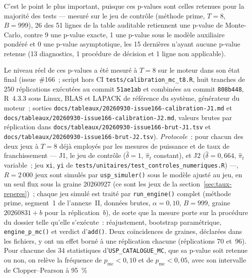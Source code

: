 \documentclass[a4paper,11pt]{article}
\newcommand{\code}[1]{\texttt{\small #1}}
\begin{document}
C'est le point le plus important, puisque ces p-values sont celles retenues pour la majorité des
tests --- mesuré sur le jeu de contrôle (méthode prime, $T = 8$, $B = 999$), 26 des 51 lignes de
la table auditable retiennent une p-value de Monte-Carlo, contre 9 une p-value exacte, 1 une
p-value sous le modèle auxiliaire pondéré et 0 une p-value asymptotique, les 15 dernières n'ayant
aucune p-value retenue (13 diagnostics, 1 procédure de décision et 1 ligne non applicable).

Le niveau réel de ces p-values a été mesuré à $T = 8$ sur le moteur dans son état final
(issue~\#166~; script hors CI \code{tests/calibration\_mc\_t8.R}, huit tranches de 250
réplications exécutées au commit \code{51ae1ab} et combinées au commit \code{808b448}, R~4.3.3
sous Linux, BLAS et LAPACK de référence du système, générateur du moteur~; sorties
\code{docs/tableaux/}\newline \code{20260930-issue166-calibration-J1.md} et
\code{docs/tableaux/}\newline \code{20260930-issue166-calibration-J2.md}, valeurs brutes par
réplication dans \code{docs/tableaux/}\newline \code{20260930-issue166-brut-J1.tsv} et
\code{docs/tableaux/}\newline \code{20260930-issue166-brut-J2.tsv}). \emph{Protocole}~: pour
chacun des deux jeux à $T = 8$ déjà employés par les mesures de puissance et de taux de
franchissement --- J1, le jeu de contrôle ($\hat\delta = 1$, $\hat\pi_t$ constant), et J2
($\hat\delta = 0{,}664$, $\hat\pi_t$ variable~; jeu \code{xi}, \code{yi} de
\code{tests/unitaires/test\_controles\_numeriques.R}) ---, $R = 2\,000$ jeux sont simulés par
\code{usp\_simuler()} sous le modèle ajusté au jeu, en un seul flux sous la graine 20260927 (ce
sont les jeux de la section~\ref{sec:taux-reperes})~; chaque jeu simulé est traité par
\code{run\_engine()} complet (méthode prime, segment~1 de l'annexe~II, données brutes,
$\alpha = 0{,}10$, $B = 999$, graine $20260831 + b$ pour la réplication~$b$), de sorte que la
mesure porte sur la procédure du dossier telle qu'elle s'exécute~: réajustement, bootstrap
paramétrique, \code{engine\_p\_mc()} et verdict d'\code{add()}. Deux coïncidences de graines,
déclarées dans les fichiers, y ont un effet borné à une réplication chacune (réplications 70
et~96). Pour chacune des 34 statistiques d'\code{USP\_CATALOGUE\_MC}, que sa p-value soit
retenue ou non, on relève la fréquence de $p_{\mathrm{mc}} < 0{,}10$ et de
$p_{\mathrm{mc}} < 0{,}05$, avec son intervalle de Clopper--Pearson à 95~\%
\end{document}
